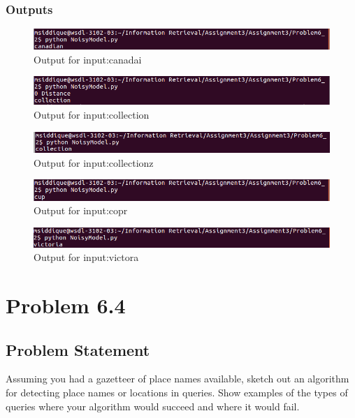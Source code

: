 \documentclass[12pt]{report}
\begin{document}
\subsection{Outputs}
\begin{figure}[ht]
  \centering
  \includegraphics[width=1\textwidth]{Problem6_2/Screenshots/canadai.PNG}
  \caption{Output for input:canadai }
  \label{fig:1}
\end{figure}
\begin{figure}[ht]
  \centering
  \includegraphics[width=1\textwidth]{Problem6_2/Screenshots/collection.PNG}
  \caption{Output for input:collection }
  \label{fig:1}
\end{figure}
\begin{figure}[ht]
  \centering
  \includegraphics[width=1\textwidth]{Problem6_2/Screenshots/collectionz.PNG}
  \caption{Output for input:collectionz }
  \label{fig:1}
\end{figure}
\begin{figure}[ht]
  \centering
  \includegraphics[width=1\textwidth]{Problem6_2/Screenshots/copr.PNG}
  \caption{Output for input:copr }
  \label{fig:1}
\end{figure}
\begin{figure}[ht]
  \centering
  \includegraphics[width=1\textwidth]{Problem6_2/Screenshots/victora.PNG}
  \caption{Output for input:victora }
  \label{fig:1}
\end{figure}

\chapter{Problem 6.4}
\section{Problem Statement}
Assuming you had a gazetteer of place names available, sketch out an algorithm for detecting place names or locations in queries. Show examples of the types of queries where your algorithm would succeed and where it would fail.
\end{document}
